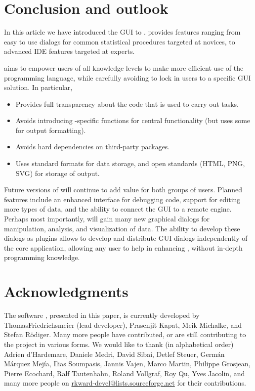 \section{Conclusion and outlook}
\label{sec:conclusion_summary}
In this article we have introduced the  GUI to .  provides features ranging
from easy to use dialogs for common statistical procedures targeted at  novices, to advanced
IDE features targeted at  experts.

 aims to empower users of all knowledge levels to make more efficient use of the 
 programming language, while carefully avoiding to lock in users to a specific
GUI solution. In particular, 
\begin{itemize}
 \item Provides full transparency about the  code that is used to carry out tasks.
 \item Avoids introducing -specific  functions for central functionality (but uses some for output formatting).
 \item Avoids hard dependencies on third-party  packages.
 \item Uses standard  formats \citep[see][]{RDCT2010c} for data storage, and open standards (HTML, PNG, SVG) for storage of output.
\end{itemize}

Future versions of  will continue to add value for both groups of users. Planned features include
an enhanced interface for debugging  code, support for editing more types of data, and the
ability to connect the  GUI to a remote  engine. Perhaps most importantly,  will
gain many new graphical dialogs for manipulation, analysis, and visualization of data. The ability to
develop these dialogs as plugins allows to develop and distribute GUI dialogs
independently of the  core application, allowing any user to help in enhancing , without in-depth
programming knowledge.

\section{Acknowledgments}
\label{sec:acknowledgments}
The software , presented in this paper, is currently developed by Thomas\linebreak Friedrichsmeier (lead developer), Prasenjit Kapat, Meik Michalke,
and Stefan R\"odiger. Many more people have contributed, or are still contributing to the project in various forms. We would like to
thank (in alphabetical order) Adrien d'Hardemare, Daniele Medri, David Sibai, Detlef Steuer, Germ\'an M\'arquez Mej\'ia,
Ilias Soumpasis, Jannis Vajen, Marco Martin, Philippe Grosjean, Pierre Ecochard, Ralf Tautenhahn, Roland Vollgraf, Roy Qu,
Yves Jacolin, and many more people on \url{rkward-devel@lists.sourceforge.net} for their contributions.


